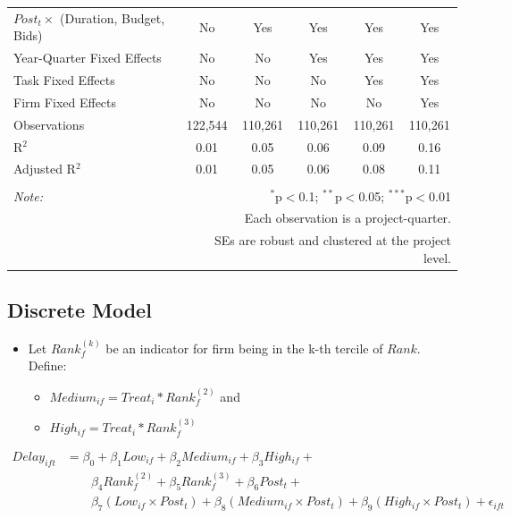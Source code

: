 \documentclass[
]{article}
\providecommand{\tightlist}{%
  \setlength{\itemsep}{0pt}\setlength{\parskip}{0pt}}
\begin{document}
\begin{table}[H]
\begin{tabular}{@{\extracolsep{-2pt}}lccccc}
$Post_t \times$  (Duration, Budget, Bids) & No & Yes & Yes & Yes & Yes \\ 
Year-Quarter Fixed Effects & No & No & Yes & Yes & Yes \\ 
Task Fixed Effects & No & No & No & Yes & Yes \\ 
Firm Fixed Effects & No & No & No & No & Yes \\ 
Observations & 122,544 & 110,261 & 110,261 & 110,261 & 110,261 \\ 
R$^{2}$ & 0.01 & 0.05 & 0.06 & 0.09 & 0.16 \\ 
Adjusted R$^{2}$ & 0.01 & 0.05 & 0.06 & 0.08 & 0.11 \\ 
\hline 
\hline \\[-1.8ex] 
\textit{Note:}  & \multicolumn{5}{r}{$^{*}$p$<$0.1; $^{**}$p$<$0.05; $^{***}$p$<$0.01} \\ 
 & \multicolumn{5}{r}{Each observation is a project-quarter.} \\ 
 & \multicolumn{5}{r}{SEs are robust and clustered at the project level.} \\ 
\end{tabular} 
\end{table}

\hypertarget{discrete-model}{%
\subsection{Discrete Model}\label{discrete-model}}

\begin{itemize}
\tightlist
\item
  Let \(Rank_f^{(k)}\) be an indicator for firm being in the k-th
  tercile of \(Rank\). Define:

  \begin{itemize}
  \tightlist
  \item
    \(Medium_{if}=Treat_i*Rank_f^{(2)}\) and
  \item
    \(High_{if} = Treat_i*Rank_f^{(3)}\)
  \end{itemize}
\end{itemize}

\[\begin{aligned} Delay_{ift} &= \beta_0+\beta_1 Low_{if}+\beta_2 Medium_{if}+\beta_3 High_{if} +\\  & \qquad  \beta_4 Rank_f^{(2)} + \beta_5 Rank_f^{(3)}+ \beta_6 Post_t + \\& \qquad \beta_7 (Low_{if} \times Post_t) + \beta_8 (Medium_{if} \times Post_t) + \beta_9 (High_{if} \times Post_t) + \epsilon_{ift} \end{aligned}\]
\end{document}

